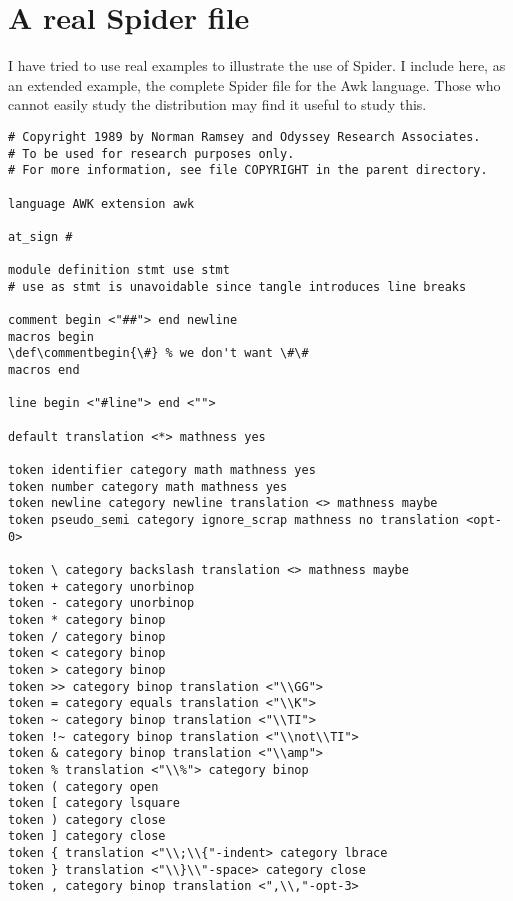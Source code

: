 \section{A real {Spider} file}
I have tried to use real examples to illustrate the use of {Spider}.
I include here, as an extended example, the complete {Spider} file for
the Awk language. 
Those who cannot easily study the distribution may find it useful to
study this.
\begingroup\small
\begin{verbatim}
# Copyright 1989 by Norman Ramsey and Odyssey Research Associates.
# To be used for research purposes only.
# For more information, see file COPYRIGHT in the parent directory.

language AWK extension awk

at_sign #

module definition stmt use stmt
# use as stmt is unavoidable since tangle introduces line breaks

comment begin <"##"> end newline
macros begin
\def\commentbegin{\#} % we don't want \#\#
macros end

line begin <"#line"> end <"">

default translation <*> mathness yes

token identifier category math mathness yes
token number category math mathness yes
token newline category newline translation <> mathness maybe
token pseudo_semi category ignore_scrap mathness no translation <opt-0>

token \ category backslash translation <> mathness maybe
token + category unorbinop
token - category unorbinop
token * category binop
token / category binop
token < category binop
token > category binop
token >> category binop translation <"\\GG">
token = category equals translation <"\\K">
token ~ category binop translation <"\\TI">
token !~ category binop translation <"\\not\\TI">
token & category binop translation <"\\amp">
token % translation <"\\%"> category binop
token ( category open
token [ category lsquare
token ) category close
token ] category close
token { translation <"\\;\\{"-indent> category lbrace
token } translation <"\\}\\"-space> category close
token , category binop translation <",\\,"-opt-3>


\end{verbatim}
